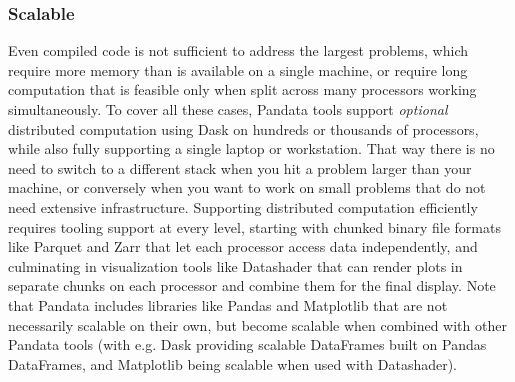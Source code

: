 \subsubsection{Scalable}
Even compiled code is not sufficient to address the largest problems, which require more memory than is available on a single machine, or require long computation that is feasible only when split across many processors working simultaneously. To cover all these cases, Pandata tools support \emph{optional} distributed computation using Dask \citep{dask} on hundreds or thousands of processors, while also fully supporting a single laptop or workstation. That way there is no need to switch to a different stack when you hit a problem larger than your machine, or conversely when you want to work on small problems that do not need extensive infrastructure. Supporting distributed computation efficiently requires tooling support at every level, starting with chunked binary file formats like Parquet and Zarr that let each processor access data independently, and culminating in visualization tools like Datashader that can render plots in separate chunks on each processor and combine them for the final display. Note that Pandata includes libraries like Pandas and Matplotlib that are not necessarily scalable on their own, but become scalable when combined with other Pandata tools (with e.g. Dask providing scalable DataFrames built on Pandas DataFrames, and Matplotlib being scalable when used with Datashader).

